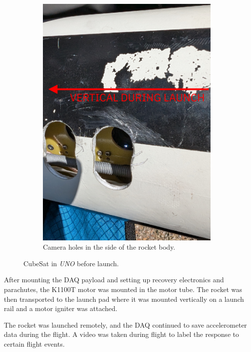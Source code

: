 \documentclass{report}
\begin{document}
\begin{figure}[H]
\begin{subfigure}{0.495\textwidth}
  \end{subfigure}
  \begin{subfigure}{0.495\textwidth}
    \centering
    \includegraphics[width=\linewidth]{images/camera-holes.jpg}
    \caption{Camera holes in the side of the rocket body.}
  \end{subfigure}
  \caption{CubeSat in \textit{UNO} before launch.}
  \label{fig:hpr-mounting}
\end{figure}

After mounting the DAQ payload and setting up recovery electronics and parachutes, the K1100T motor was mounted in the motor tube. The rocket was then transported to the launch pad where it was mounted vertically on a launch rail and a motor igniter was attached.

The rocket was launched remotely, and the DAQ continued to save accelerometer data during the flight. A video was taken during flight to label the response to certain flight events.
\end{document}

